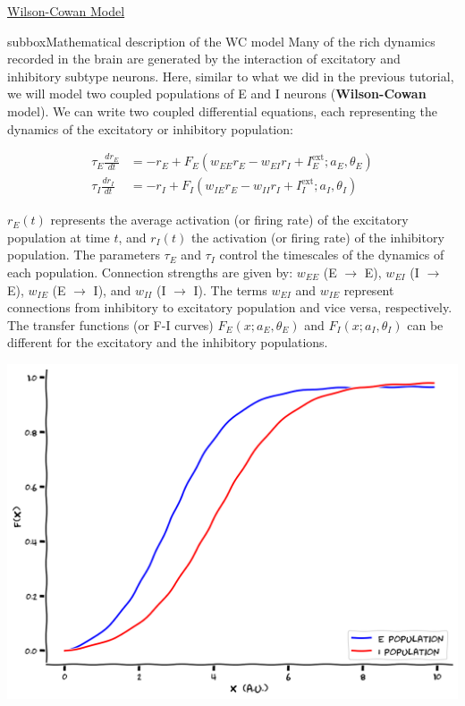 \begin{textbox}{\href{https://compneuro.neuromatch.io/tutorials/W2D4_DynamicNetworks/chapter_title.html}{Wilson-Cowan Model } }
\begin{subbox}{subbox}{Mathematical description of the WC model}
\scriptsize
Many of the rich dynamics recorded in the brain are generated by the interaction of excitatory and inhibitory subtype neurons. Here, similar to what we did in the previous tutorial, we will model two coupled populations of E and I neurons (\textbf{Wilson-Cowan} model). We can write two coupled differential equations, each representing the dynamics of the excitatory or inhibitory population:

\begin{align*}
\tau_E \frac{dr_E}{dt} &= -r_E + F_E(w_{EE}r_E -w_{EI}r_I + I^{\text{ext}}_E;a_E,\theta_E)\\
\tau_I \frac{dr_I}{dt} &= -r_I + F_I(w_{IE}r_E -w_{II}r_I + I^{\text{ext}}_I;a_I,\theta_I)    
\end{align*}

$r_E(t)$ represents the average activation (or firing rate) of the excitatory population at time $t$, and $r_I(t)$ the activation (or firing rate) of the inhibitory population. The parameters $\tau_E$ and $\tau_I$ control the timescales of the dynamics of each population. Connection strengths are given by: $w_{EE}$ (E $\rightarrow$ E), $w_{EI}$ (I $\rightarrow$ E), $w_{IE}$ (E $\rightarrow$ I), and $w_{II}$ (I $\rightarrow$ I). The terms $w_{EI}$ and $w_{IE}$ represent connections from inhibitory to excitatory population and vice versa, respectively. The transfer functions (or F-I curves) $F_E(x;a_E,\theta_E)$ and $F_I(x;a_I,\theta_I)$ can be different for the excitatory and the inhibitory populations.
\begin{center}
\includegraphics[scale=0.28]{Figures/DN/DN_Figure5.png}
\end{center}
\end{subbox}

\end{textbox}
